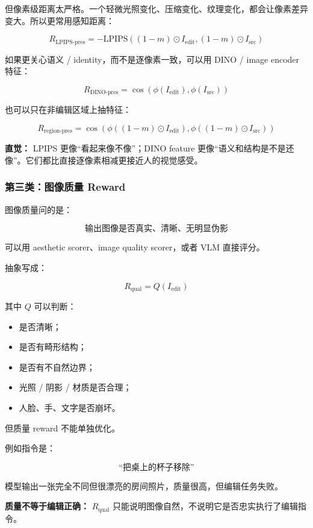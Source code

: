 但像素级距离太严格。一个轻微光照变化、压缩变化、纹理变化，都会让像素差异变大。所以更常用感知距离：

\[
R_\text{LPIPS-pres}
=
-
\text{LPIPS}
\left(
(1-m)\odot I_\text{edit},
(1-m)\odot I_\text{src}
\right)
\]

如果更关心语义 / identity，而不是逐像素一致，可以用 DINO / image encoder 特征：

\[
R_\text{DINO-pres}
=
\cos
\left(
\phi(I_\text{edit}),
\phi(I_\text{src})
\right)
\]

也可以只在非编辑区域上抽特征：

\[
R_\text{region-pres}
=
\cos
\left(
\phi((1-m)\odot I_\text{edit}),
\phi((1-m)\odot I_\text{src})
\right)
\]

\begin{intubox}
\textbf{直觉：} LPIPS 更像“看起来像不像”；DINO feature 更像“语义和结构是不是还像”。它们都比直接逐像素相减更接近人的视觉感受。
\end{intubox}

\subsubsection{第三类：图像质量 Reward}

图像质量问的是：

\[
\text{输出图像是否真实、清晰、无明显伪影}
\]

可以用 aesthetic scorer、image quality scorer，或者 VLM 直接评分。

抽象写成：

\[
R_\text{qual}
=
Q(I_\text{edit})
\]

其中 $Q$ 可以判断：

\begin{itemize}[leftmargin=1.5em]
  \item 是否清晰；
  \item 是否有畸形结构；
  \item 是否有不自然边界；
  \item 光照 / 阴影 / 材质是否合理；
  \item 人脸、手、文字是否崩坏。
\end{itemize}

但质量 reward 不能单独优化。

例如指令是：

\[
\text{``把桌上的杯子移除''}
\]

模型输出一张完全不同但很漂亮的房间照片，质量很高，但编辑任务失败。

\begin{warnbox}
\textbf{质量不等于编辑正确：} $R_\text{qual}$ 只能说明图像自然，不说明它是否忠实执行了编辑指令。
\end{warnbox}

